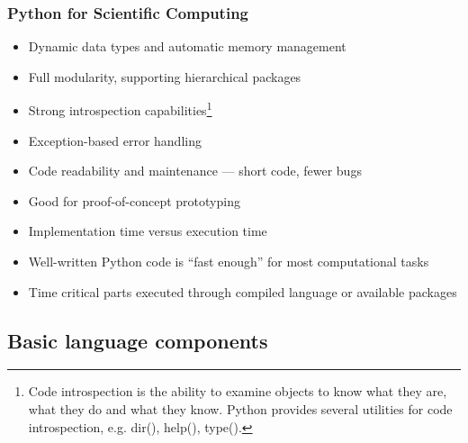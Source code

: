 \begin{frame}
  \MyLogo
  \frametitle{Python for Scientific Computing}  

\small
\smallskip
{}
\begin{itemize}
	\item Dynamic data types and automatic memory management
	\item Full modularity, supporting hierarchical packages
	\item Strong introspection capabilities\footnote[frame]{\scriptsize\color{PineGreen}Code introspection is the ability to examine objects to know what they are, what they do and what they know. Python provides several utilities for code introspection, e.g. dir(), help(), type().}
	\item Exception-based error handling
\end{itemize}

\begin{itemize}
	\item Code readability and maintenance --- \alert{short code, fewer bugs}
	\item Good for proof-of-concept prototyping
	\item Implementation time versus execution time
	\item Well-written Python code is ``fast enough'' for most computational tasks
	\item Time critical parts executed through compiled language or \alert{available packages}
\end{itemize}

\end{frame}

\subsection{Basic language components}

